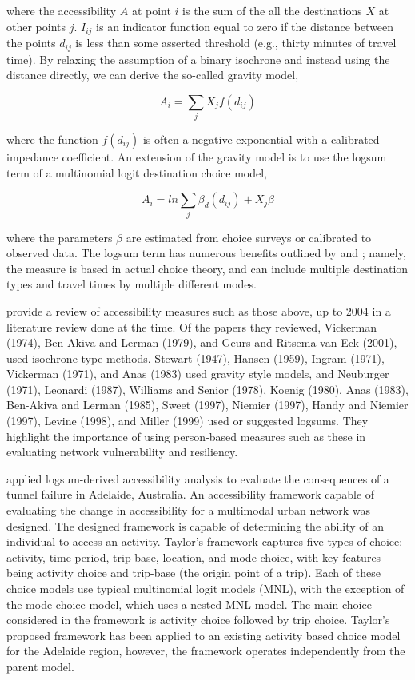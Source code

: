 \noindent where the accessibility \(A\) at point \(i\) is the sum of the all the
destinations \(X\) at other points \(j\). \(I_{ij}\) is an indicator
function equal to
zero if the distance between the points $d_{ij}$ is less than some asserted
threshold (e.g., thirty minutes of travel time). By relaxing the
assumption of a
binary isochrone and instead using the distance directly, we can derive the
so-called gravity model,

\begin{equation}
A_i = \sum_{j} X_j f(d_{ij})
  \label{eqn::gravity}
\end{equation}

\noindent where the function $f(d_{ij})$ is often a negative exponential with a
calibrated
impedance coefficient. An extension of the gravity model is to use the
logsum
term of a multinomial logit destination choice model,

\begin{equation}
A_i = ln\sum_{j} \beta_d(d_{ij}) + X_j\beta
  \label{eqn:logsum1}
\end{equation}

\noindent where the parameters $\beta$ are estimated from choice surveys or
calibrated to
observed data. The logsum term has numerous benefits outlined by
\citet{handy1997}
and \citet{geurs2004}; namely, the measure is based in actual choice
theory, and
can include multiple destination types and travel times by multiple
different modes.

\citet{geurs2004} provide a review of accessibility measures such as those
above, up to
2004 in a literature review done at the time. Of the papers they reviewed,
Vickerman (1974), Ben-Akiva and Lerman
(1979), and Geurs and
Ritsema van Eck (2001), used isochrone type methods. Stewart (1947),
Hansen (1959), Ingram (1971), Vickerman (1971), and Anas (1983) used gravity
style models, and
Neuburger (1971), Leonardi (1987),
Williams and Senior (1978), Koenig (1980), Anas (1983), Ben-Akiva and Lerman
(1985), Sweet
(1997), Niemier (1997), Handy and Niemier (1997), Levine (1998), and Miller
(1999) used or
suggested logsums. They highlight the importance of using person-based
measures such as these in
evaluating network vulnerability and resiliency.

\citet{taylor2008} applied logsum-derived accessibility analysis to
evaluate the consequences of a tunnel failure in Adelaide, Australia. An
accessibility framework capable of evaluating the change in accessibility
for a multimodal urban network was designed. The designed framework is
capable of determining the ability of an individual to access an activity.
Taylor's framework captures five types of choice: activity, time period,
trip-base, location, and mode choice, with key features being activity
choice and trip-base (the origin point of a trip). Each of these choice
models use typical multinomial logit models (MNL), with the exception of
the mode choice model, which uses a nested MNL model. The main choice
considered in the framework is activity choice followed by trip choice.
Taylor's proposed framework has been applied to an existing activity based
choice model for the Adelaide region, however, the framework operates
independently from the parent model.

